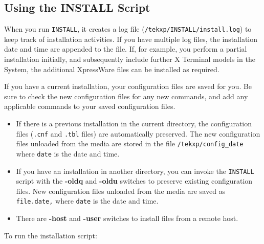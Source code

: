 \documentclass[11pt]{article}
\begin{document}
\subsection {Using the INSTALL Script}

When you run {\tt INSTALL}, it creates a log file
({\tt /tekxp/INSTALL/install.log}) to keep track of installation activities.
If you have multiple log files, the installation date and time are appended to
the file. If, for example, you perform a partial installation initially, and
subsequently include further X Terminal models in the System, the additional
XpressWare files can be installed as required.

If you have a current installation, your configuration files are saved for you.
Be sure to check the new configuration files for any new commands, and add any
applicable commands to your saved configuration files.

\begin {itemize}

\item If there is a previous installation in the current directory, the
configuration files ({\tt .cnf} and {\tt .tbl} files) are automatically
preserved. The new configuration files unloaded from the media are stored in
the file {\tt /tekxp/config\_date} where {\tt date} is the date and time.

\item If you have an installation in another directory, you can invoke the
{\tt INSTALL} script with the {\bf -oldq} and {\bf -oldu} switches to preserve
existing configuration files. New configuration files unloaded from the media
are saved as {\tt file.date,} where {\tt date} is the date and time.

\item There are {\bf -host} and {\bf -user} switches to install files from a
remote host.

\end {itemize}

To run the installation script:
\end{document}
